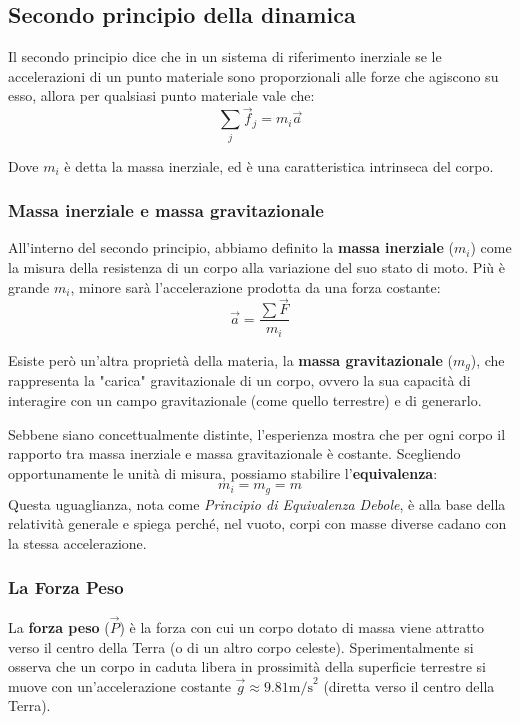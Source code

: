 \documentclass[11pt, a4paper, openright]{book}
\theoremstyle{plain}
\theoremstyle{definition}
\begin{document}
\subsection{Secondo principio della dinamica}
Il secondo principio dice che in un sistema di riferimento inerziale se le accelerazioni di un punto materiale sono proporzionali alle forze che agiscono su esso, allora per qualsiasi punto materiale vale che:
\begin{equation*}
    \sum_j \vec{f}_j = m_i\vec{a} 
\end{equation*}

Dove $m_i$ è detta la massa inerziale, ed è una caratteristica intrinseca del corpo.

\subsubsection{Massa inerziale e massa gravitazionale}
All'interno del secondo principio, abbiamo definito la \textbf{massa inerziale} ($m_i$) come la misura della resistenza di un corpo alla variazione del suo stato di moto. Più è grande $m_i$, minore sarà l'accelerazione prodotta da una forza costante:
\[ \vec{a} = \frac{\sum \vec{F}}{m_i} \]

Esiste però un'altra proprietà della materia, la \textbf{massa gravitazionale} ($m_g$), che rappresenta la "carica" gravitazionale di un corpo, ovvero la sua capacità di interagire con un campo gravitazionale (come quello terrestre) e di generarlo.

Sebbene siano concettualmente distinte, l'esperienza mostra che per ogni corpo il rapporto tra massa inerziale e massa gravitazionale è costante. Scegliendo opportunamente le unità di misura, possiamo stabilire l'\textbf{equivalenza}:
\[ m_i = m_g = m \]
Questa uguaglianza, nota come \textit{Principio di Equivalenza Debole}, è alla base della relatività generale e spiega perché, nel vuoto, corpi con masse diverse cadano con la stessa accelerazione.

\subsubsection{La Forza Peso}
La \textbf{forza peso} ($\vec{P}$) è la forza con cui un corpo dotato di massa viene attratto verso il centro della Terra (o di un altro corpo celeste). Sperimentalmente si osserva che un corpo in caduta libera in prossimità della superficie terrestre si muove con un'accelerazione costante $\vec{g} \approx 9.81  \text{m/s}^2$ (diretta verso il centro della Terra).
\end{document}
